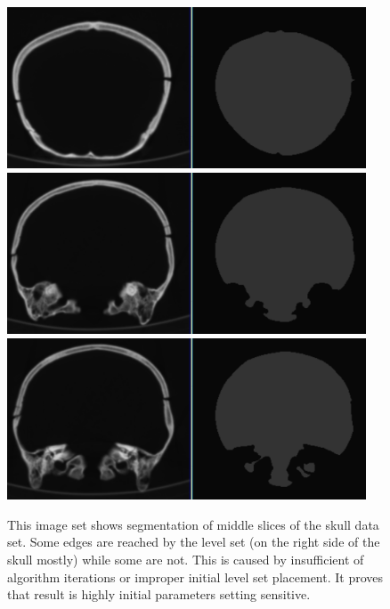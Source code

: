 \begin{figure}
    \centering
    \includegraphics[width=0.95\textwidth]{data/png/12}
    \includegraphics[width=0.95\textwidth]{data/png/17}
    \includegraphics[width=0.95\textwidth]{data/png/18}
    \caption[Result of segmentation middle slices of the skull data set]
{
This image set shows segmentation of middle slices of the skull data set.
Some edges are reached by the level set (on the right side of the skull mostly) while some are not.
This is caused by insufficient of algorithm iterations or improper initial level set placement.
It proves that result is highly initial parameters setting sensitive.
}
    \label{fg:middleSlicesSegmentation}
\end{figure}

